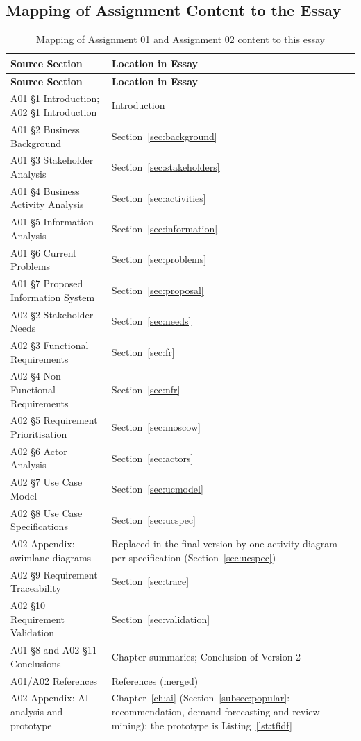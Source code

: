 \documentclass[11pt,a4paper,oneside]{extreport}
\newif\ifshowvtwo
\newcommand{\upd}[1]{\ifshowvtwo\textcolor{red}{#1}\else#1\fi}
\begin{document}
\subsection*{Mapping of Assignment Content to the Essay}
{\small
\begin{xltabular}{\textwidth}{@{}L{6.4cm} Y@{}}
\caption{Mapping of Assignment 01 and Assignment 02 content to this essay}\label{tab:mapping}\\
\toprule
\textbf{Source Section} & \textbf{Location in Essay} \\ \midrule
\endfirsthead
\toprule
\textbf{Source Section} & \textbf{Location in Essay} \\ \midrule
\endhead
\bottomrule
\endlastfoot
A01 \S1 Introduction; A02 \S1 Introduction & Introduction \\
A01 \S2 Business Background & Section~\ref{sec:background} \\
A01 \S3 Stakeholder Analysis & Section~\ref{sec:stakeholders} \\
A01 \S4 Business Activity Analysis & Section~\ref{sec:activities} \\
A01 \S5 Information Analysis & Section~\ref{sec:information} \\
A01 \S6 Current Problems & Section~\ref{sec:problems} \\
A01 \S7 Proposed Information System & Section~\ref{sec:proposal} \\
A02 \S2 Stakeholder Needs & Section~\ref{sec:needs} \\
A02 \S3 Functional Requirements & Section~\ref{sec:fr} \\
A02 \S4 Non-Functional Requirements & Section~\ref{sec:nfr} \\
A02 \S5 Requirement Prioritisation & Section~\ref{sec:moscow} \\
A02 \S6 Actor Analysis & Section~\ref{sec:actors} \\
A02 \S7 Use Case Model & Section~\ref{sec:ucmodel} \\
A02 \S8 Use Case Specifications & Section~\ref{sec:ucspec} \\
A02 Appendix: swimlane diagrams & Replaced in the final version by one activity diagram per specification (Section~\ref{sec:ucspec}) \\
A02 \S9 Requirement Traceability & Section~\ref{sec:trace} \\
A02 \S10 Requirement Validation & Section~\ref{sec:validation} \\
A01 \S8 and A02 \S11 Conclusions & Chapter summaries; Conclusion of Version \upd{2} \\
A01/A02 References & References (merged) \\
A02 Appendix: AI analysis and prototype & \upd{Chapter~\ref{ch:ai} (Section~\ref{subsec:popular}: recommendation, demand forecasting and review mining); the prototype is Listing~\ref{lst:tfidf}} \\
\end{xltabular}
}
\end{document}
